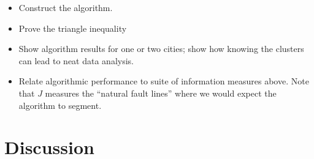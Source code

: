 \documentclass[english]{scrartcl}
\begin{document}
	\begin{itemize}
		\item Construct the algorithm. 
		\item Prove the triangle inequality
		\item Show algorithm results for one or two cities; show how knowing the clusters can lead to neat data analysis. 
		\item Relate algorithmic performance to suite of information measures above. Note that $J$ measures the ``natural fault lines'' where we would expect the algorithm to segment.  
	\end{itemize}

\section{Discussion} \label{sec:discussion}

{}




\end{document}
